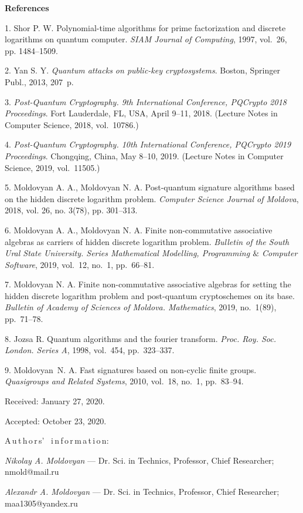 

{\small



\vskip6mm

\noindent \textbf{References} }

\vskip 2mm

{\footnotesize



1. Shor P. W. Polynomial-time algorithms for prime factorization
and discrete logarithms on quantum computer. \textit{SIAM Journal
of Computing}, 1997, vol.~26, pp. 1484--1509.

2. Yan S. Y. \textit{Quantum attacks on public-key cryptosystems}.
Boston, Springer Publ., 2013, 207~p.

3. \textit{Post-Quantum Cryptography. 9th International
Conference, PQCrypto 2018 Proceedings}. Fort Lauderdale, FL, USA,
April 9--11, 2018. (Lecture Notes in Computer Science, 2018,
vol.~10786.)

4. \textit{Post-Quantum Cryptography. 10th International
Conference, PQCrypto 2019 Proceedings}. Chongqing, China, May
8--10, 2019. (Lecture Notes in Computer Science, 2019,
vol.~11505.)

5. Moldovyan A. A., Moldovyan N. A. Post-quantum signature
algorithms based on the hidden discrete logarithm problem.
\textit{Computer Science Journal of Moldova}, 2018, vol. 26, no.
3(78), pp. 301--313.

6. Moldovyan A. A., Moldovyan N. A. Finite non-commutative
associative algebras as carriers of hidden discrete logarithm
problem. \textit{Bulletin of the South Ural State University.
Series Mathematical Modelling, Programming $\&$ Computer
Software}, 2019, vol.~12, no.~1, pp.~66--81.

7. Moldovyan N. A. Finite non-commutative associative algebras for
setting the hidden discrete lo\-ga\-rithm problem and post-quantum
cryptoschemes on its base. \textit{Bulletin of Academy of Sciences
of Moldova. Mathematics}, 2019, no.~1(89), pp.~71--78.

8. Jozsa R. Quantum algorithms and the fourier transform.
\textit{Proc. Roy. Soc. London. Series A}, 1998, vol.~454,
pp.~323--337.

9. Moldovyan~N. A. Fast signatures based on non-cyclic finite
groups. \textit{Quasigroups and Related Systems}, 2010, vol.~18,
no.~1, pp.~83--94.


\vskip 1.5mm

%


Received:  January 27, 2020.

Accepted: October 23, 2020.

\vskip 6mm A\,u\,t\,h\,o\,r\,s' \ i\,n\,f\,o\,r\,m\,a\,t\,i\,o\,n:

\vskip 2mm \textit{Nikolay A. Moldovyan} --- Dr. Sci. in Technics,
Professor, Chief Researcher; nmold@mail.ru

\vskip 2mm \textit{Alexandr A. Moldovyan} --- Dr. Sci. in
Technics, Professor, Chief Researcher; maa1305@yandex.ru


}

